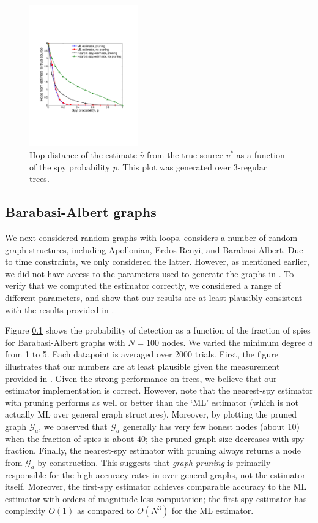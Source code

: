 \begin{figure}
\centering
\includegraphics[height = 2.4in]{figures/hops_vs_spies}
\caption{Hop distance of the estimate $\hat v$ from the true source $v^*$ as a function of the spy probability $p$. This plot was generated over 3-regular trees. %
}
\label{fig:hops_vs_spies}
\end{figure}

\subsection{Barabasi-Albert graphs}
We next considered random graphs with loops. \cite{pinto} considers a number of random graph structures, including Apollonian, Erdos-Renyi, and Barabasi-Albert. Due to time constraints, we only considered the latter. However, as mentioned earlier, we did not have access to the parameters used to generate the graphs in \cite{pinto}. To verify that we computed the estimator correctly, we considered a range of different parameters, and show that our results are at least plausibly consistent with the results provided in \cite{pinto}.

Figure \ref{} shows the probability of detection as a function of the fraction of spies for Barabasi-Albert graphs with $N=100$ nodes. We varied the minimum degree $d$ from 1 to 5. Each datapoint is averaged over 2000 trials. First, the figure illustrates that our numbers are at least plausible given the measurement provided in \cite{pinto}. Given the strong performance on trees, we believe that our estimator implementation is correct. %
However, note that the nearest-spy estimator with pruning performs as well or better than the `ML' estimator (which is not actually ML over general graph structures). Moreover, by plotting the pruned graph $\mathcal G_a$, we observed that $\mathcal G_a$ generally has very few honest nodes (about 10) when the fraction of spies is about 40; the pruned graph size decreases with spy fraction. Finally, the nearest-spy estimator with pruning always returns a node from $\mathcal G_a$ by construction.  This suggests that \emph{graph-pruning} is primarily responsible for the high accuracy rates in \cite{pinto} over general graphs, not the estimator itself. Moreover, the first-spy estimator achieves comparable accuracy to the ML estimator with orders of magnitude less computation; the first-spy estimator has complexity $O(1)$ as compared to $O(N^3)$ for the ML estimator. 

